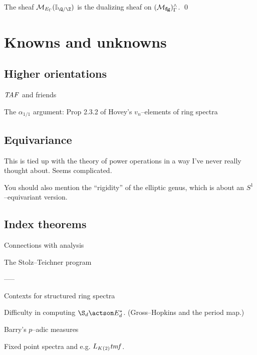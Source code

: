 \begin{theorem}
The sheaf $\context{E_\Gamma}(\mathbb I_{\Q/\Z})$ is the dualizing sheaf on $(\mathcal{M}_{\mathbf{fg}})^\wedge_\Gamma$. \qed
\end{theorem}





\section{Knowns and unknowns}



\subsection*{Higher orientations}

$\mathit{TAF}$ and friends\label{TAFDiscussion}

The $\alpha_{1/1}$ argument: Prop 2.3.2 of Hovey's $v_n$--elements of ring spectra


\subsection*{Equivariance}

This is tied up with the theory of power operations in a way I've never really thought about.  Seems complicated.

You should also mention the ``rigidity'' of the elliptic genus, which is about an $S^1$--equivariant version.

\subsection*{Index theorems}

Connections with analysis

The Stolz--Teichner program








-----

Contexts for structured ring spectra

Difficulty in computing $\S_d \actson E_d^*$. (Gross--Hopkins and the period map.)

Barry's $p$--adic measures

Fixed point spectra and e.g. $L_{K(2)} \mathit{tmf}$.


